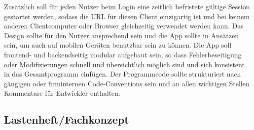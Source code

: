 Zusätzlich soll für jeden Nutzer beim Login eine zeitlich befristete gültige Session gestartet werden, sodass die \acs{URL} für diesen Client einzigartig ist und bei keinem anderen Clientcomputer oder Browser gleichzeitig verwendet werden kann. Das Design sollte für den Nutzer ansprechend sein und die App sollte in Ansätzen  sein, um auch auf mobilen Geräten benutzbar sein zu können.
Die App soll frontend- und backendseitig modular aufgebaut sein, so dass Fehlerbeseitigung oder Modifizierungen schnell und übersichtlich möglich sind und sich konsistent in das Gesamtprogramm einfügen.
Der Programmcode sollte strukturiert nach gängigen oder firminternen Code-Conventions sein und an allen wichtigen Stellen Kommentare für Entwickler enthalten.


\subsection{Lastenheft/Fachkonzept}
\label{sec:Lastenheft}

